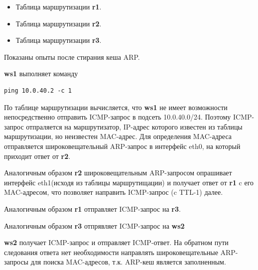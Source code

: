\documentclass[a4paper,12pt]{article}
\begin{document}

\begin{itemize}
\item Таблица маршрутизации \textbf{r1}.


\item Таблица маршрутизации \textbf{r2}.


\item Таблица маршрутизации \textbf{r3}.

\end{itemize}

Показаны опыты после стирания кеша ARP.


\textbf{ws1} выполняет команду
\begin{lstlisting}
ping 10.0.40.2 -c 1
\end{lstlisting}

По таблице маршрутизации вычисляется, что \textbf{ws1} не имеет возможности непосредственно отправить ICMP-запрос в подсеть 10.0.40.0/24. Поэтому ICMP-запрос отпраляется на маршрутизатор, IP-адрес которого известен из таблицы маршрутизации, но неизвестен MAC-адрес. Для определения MAC-адреса отправляется широковещательный ARP-запрос в интерфейс eth0, на который приходит ответ от \textbf{r2}.


Аналогичным образом \textbf{r2} широковещательным ARP-запросом опрашивает интерфейс eth1(исходя из таблицы маршрутищации) и получает ответ от \textbf{r1} c его MAC-адресом, что позволяет направить ICMP-запрос (c TTL-1) далее.


Аналогичным образом \textbf{r1} отправляет ICMP-запрос на \textbf{r3}.



Аналогичным образом \textbf{r3} отпрявляет ICMP-запрос на \textbf{ws2}



\textbf{ws2} получает ICMP-запрос и отправляет ICMP-ответ. На обратном пути следования ответа нет необходимости направлять широковещательные ARP-запросы для поиска MAC-адресов, т.к. ARP-кеш является заполненным.

\end{document}
